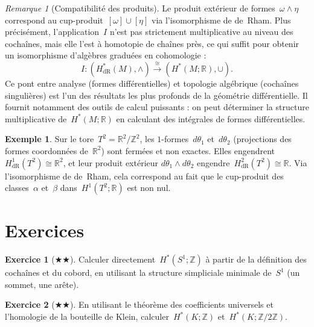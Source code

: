 \documentclass[12pt,a4paper,openany]{book}
\theoremstyle{definition}
\newtheorem{exemple}[definition]{Exemple}
\newtheorem{exercice}{Exercice}[chapter]
\theoremstyle{plain}
\theoremstyle{remark}
\newtheorem{remarque}[definition]{Remarque}
\newcommand{\Z}{\mathbb{Z}}
\newcommand{\R}{\mathbb{R}}
\begin{document}
\begin{remarque}[Compatibilité des produits]\label{rem:de-rham-produit}
Le produit extérieur de formes~$\omega \wedge \eta$
correspond au cup-produit~$[\omega] \cup [\eta]$ via l'isomorphisme de de~Rham. Plus
précisément, l'application~$I$ n'est pas strictement multiplicative au niveau des
cochaînes, mais elle l'est à homotopie de chaînes près, ce qui suffit pour obtenir
un isomorphisme d'algèbres graduées en cohomologie :
\[
  I \colon (H^*_{\mathrm{dR}}(M), \wedge)
  \xrightarrow{\;\cong\;} (H^*(M; \R), \cup).
\]
Ce pont entre analyse (formes différentielles) et topologie algébrique (cochaînes
singulières) est l'un des résultats les plus profonds de la géométrie différentielle.
Il fournit notamment des outils de calcul puissants : on peut déterminer la structure
multiplicative de~$H^*(M;\R)$ en calculant des intégrales de formes différentielles.
\end{remarque}

\begin{exemple}\label{ex:de-rham-tore}
Sur le tore~$T^2 = \R^2/\Z^2$, les $1$-formes~$d\theta_1$ et~$d\theta_2$ (projections
des formes coordonnées de~$\R^2$) sont fermées et non exactes. Elles engendrent
$H^1_{\mathrm{dR}}(T^2) \cong \R^2$, et leur produit extérieur
$d\theta_1 \wedge d\theta_2$ engendre~$H^2_{\mathrm{dR}}(T^2) \cong \R$.
Via l'isomorphisme de de~Rham, cela correspond au fait que le cup-produit des
classes~$\alpha$ et~$\beta$ dans~$H^1(T^2;\R)$ est non nul.
\end{exemple}

\section{Exercices}\label{sec:cohomologie-exercices}

\begin{exercice}[$\bigstar\bigstar$]\label{exo:cohomologie-s1}
Calculer directement~$H^*(S^1; \Z)$ à partir de la définition des cochaînes et
du cobord, en utilisant la structure simpliciale minimale de~$S^1$ (un sommet, une arête).
\end{exercice}

\begin{exercice}[$\bigstar\bigstar$]\label{exo:coeff-univ-klein}
En utilisant le théorème des coefficients universels et l'homologie de la bouteille
de Klein, calculer~$H^*(K; \Z)$ et~$H^*(K; \Z/2\Z)$.
\end{exercice}
\end{document}
